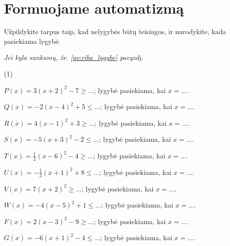 \documentclass[11pt,a4paper]{scrartcl}
\makeatletter
\numberwithin{exercise}{section}
\renewenvironment{exercise}{\@thm{\th@definition}{exercise}{}}{\@endtheorem}
\newcommand{\pagalba}[1]{{\small\itshape Jei kyla sunkumų, žr. \ref{#1} pavyzdį.}}
\makeatother
\begin{document}
\section{Formuojame automatizmą}

\begin{exercise}\label{uz:riba_lygybe}
Užpildykite tarpus taip, kad nelygybės būtų teisingos, ir nurodykite, kada pasiekiama lygybė.

\par\pagalba{pv:riba_lygybe}

\begin{tasks}[label=(\arabic*),label-width=2em](1)

\task $P(x)=3(x+2)^2-7\geq\ldots$; lygybė pasiekiama, kai $x=\ldots$.

\task $Q(x)=-2(x-4)^2+5\leq\ldots$; lygybė pasiekiama, kai $x=\ldots$.

\task $R(x)=4(x-1)^2+3\geq\ldots$; lygybė pasiekiama, kai $x=\ldots$.

\task $S(x)=-5(x+3)^2-2\leq\ldots$; lygybė pasiekiama, kai $x=\ldots$.

\task $T(x)=\frac12(x-6)^2-4\geq\ldots$; lygybė pasiekiama, kai $x=\ldots$.

\task $U(x)=-\frac13(x+1)^2+8\leq\ldots$; lygybė pasiekiama, kai $x=\ldots$.

\task $V(x)=7(x+2)^2\geq\ldots$; lygybė pasiekiama, kai $x=\ldots$.

\task $W(x)=-4(x-5)^2+1\leq\ldots$; lygybė pasiekiama, kai $x=\ldots$.

\task $F(x)=2(x-3)^2-9\geq\ldots$; lygybė pasiekiama, kai $x=\ldots$.

\task $G(x)=-6(x+1)^2-4\leq\ldots$; lygybė pasiekiama, kai $x=\ldots$.

\end{tasks}
\end{exercise}
\newpage
\end{document}
